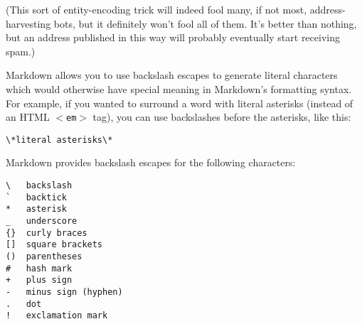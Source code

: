 (This sort of entity-encoding trick will indeed fool many, if not
most, address-harvesting bots, but it definitely won't fool all of
them. It's better than nothing, but an address published in this way
will probably eventually start receiving spam.)

Markdown allows you to use backslash escapes to generate literal
characters which would otherwise have special meaning in Markdown's
formatting syntax. For example, if you wanted to surround a word
with literal asterisks (instead of an HTML \texttt{$<$em$>$} tag), you can use
backslashes before the asterisks, like this:

\begin{verbatim}
\*literal asterisks\*
\end{verbatim}

Markdown provides backslash escapes for the following characters:

\begin{verbatim}
\   backslash
`   backtick
*   asterisk
_   underscore
{}  curly braces
[]  square brackets
()  parentheses
#   hash mark
+   plus sign
-   minus sign (hyphen)
.   dot
!   exclamation mark
\end{verbatim}
